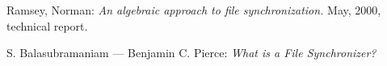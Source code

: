 \begin{thebibliography}{99}

 Ramsey, Norman: {\it An algebraic approach to
file synchronization.} May, 2000, technical report.

 S. Balasubramaniam --- Benjamin C. Pierce:
{\it What is a File Synchronizer?}

\end{thebibliography}
